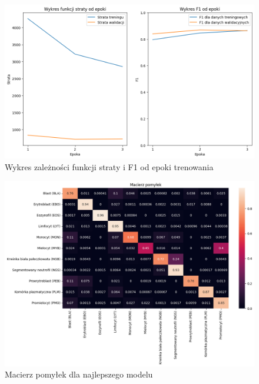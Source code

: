 
\begin{figure}
    \centering
    \includegraphics[width=\textwidth]{experiments/efficientnet_b0/combined}
    \caption{Wykres zależności funkcji straty i F1 od epoki trenowania}
\end{figure}

\begin{figure}
    \centering
    \includegraphics[width=\textwidth]{experiments/efficientnet_b0/confusion_matrix}
    \caption{Macierz pomyłek dla najlepszego modelu}
\end{figure}

